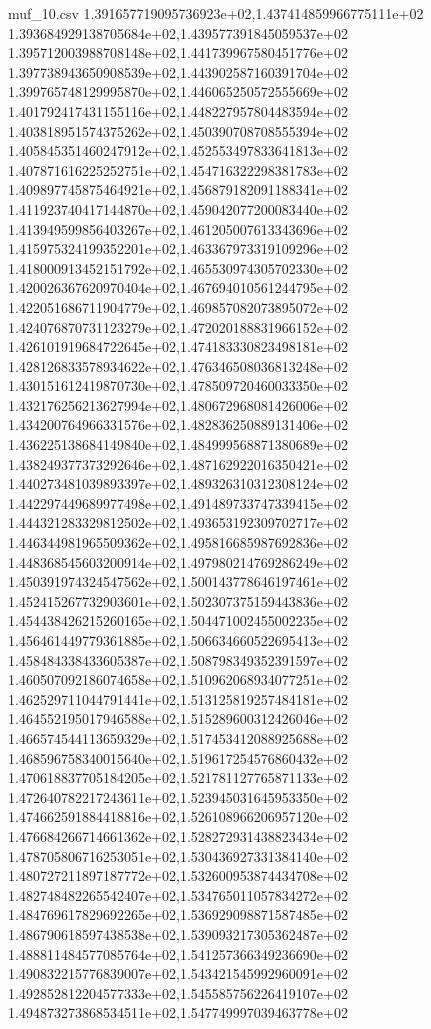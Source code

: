 \begin{filecontents*}{muf_10.csv}
1.391657719095736923e+02,1.437414859966775111e+02
1.393684929138705684e+02,1.439577391845059537e+02
1.395712003988708148e+02,1.441739967580451776e+02
1.397738943650908539e+02,1.443902587160391704e+02
1.399765748129995870e+02,1.446065250572555669e+02
1.401792417431155116e+02,1.448227957804483594e+02
1.403818951574375262e+02,1.450390708708555394e+02
1.405845351460247912e+02,1.452553497833641813e+02
1.407871616225252751e+02,1.454716322298381783e+02
1.409897745875464921e+02,1.456879182091188341e+02
1.411923740417144870e+02,1.459042077200083440e+02
1.413949599856403267e+02,1.461205007613343696e+02
1.415975324199352201e+02,1.463367973319109296e+02
1.418000913452151792e+02,1.465530974305702330e+02
1.420026367620970404e+02,1.467694010561244795e+02
1.422051686711904779e+02,1.469857082073895072e+02
1.424076870731123279e+02,1.472020188831966152e+02
1.426101919684722645e+02,1.474183330823498181e+02
1.428126833578934622e+02,1.476346508036813248e+02
1.430151612419870730e+02,1.478509720460033350e+02
1.432176256213627994e+02,1.480672968081426006e+02
1.434200764966331576e+02,1.482836250889131406e+02
1.436225138684149840e+02,1.484999568871380689e+02
1.438249377373292646e+02,1.487162922016350421e+02
1.440273481039893397e+02,1.489326310312308124e+02
1.442297449689977498e+02,1.491489733747339415e+02
1.444321283329812502e+02,1.493653192309702717e+02
1.446344981965509362e+02,1.495816685987692836e+02
1.448368545603200914e+02,1.497980214769286249e+02
1.450391974324547562e+02,1.500143778646197461e+02
1.452415267732903601e+02,1.502307375159443836e+02
1.454438426215260165e+02,1.504471002455002235e+02
1.456461449779361885e+02,1.506634660522695413e+02
1.458484338433605387e+02,1.508798349352391597e+02
1.460507092186074658e+02,1.510962068934077251e+02
1.462529711044791441e+02,1.513125819257484181e+02
1.464552195017946588e+02,1.515289600312426046e+02
1.466574544113659329e+02,1.517453412088925688e+02
1.468596758340015640e+02,1.519617254576860432e+02
1.470618837705184205e+02,1.521781127765871133e+02
1.472640782217243611e+02,1.523945031645953350e+02
1.474662591884418816e+02,1.526108966206957120e+02
1.476684266714661362e+02,1.528272931438823434e+02
1.478705806716253051e+02,1.530436927331384140e+02
1.480727211897187772e+02,1.532600953874434708e+02
1.482748482265542407e+02,1.534765011057834272e+02
1.484769617829692265e+02,1.536929098871587485e+02
1.486790618597438538e+02,1.539093217305362487e+02
1.488811484577085764e+02,1.541257366349236690e+02
1.490832215776839007e+02,1.543421545992960091e+02
1.492852812204577333e+02,1.545585756226419107e+02
1.494873273868534511e+02,1.547749997039463778e+02

\end{filecontents*}

